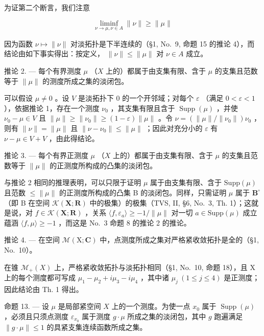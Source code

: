 为证第二个断言，我们注意

\[
\liminf _ {\nu \to \mu ,   \nu \in A} \| \nu \| \geqslant \| \mu \|
\]

因为函数 \(\nu \mapsto \| \nu \|\) 对淡拓扑是下半连续的（§1, No.~9, 命题 15 的推论 4），而结论由如下事实得出：按定义， \(\| \nu \| \leqslant \| \mu \|\) 对 \(\nu \in A\) 成立。

推论 2. --- 每个有界测度 \(\mu\) （\(X\) 上的）都属于由支集有限、含于 \(\mu\) 的支集且范数等于 \(\|\mu\|\) 的测度所成之集的淡闭包。

可以假设 \(\mu \neq 0\) 。设 \(V\) 是淡拓扑下 0 的一个开邻域；对每个 \(\varepsilon\) （满足 \(0 < \varepsilon < 1\) ），依据推论 1，存在一个测度 \(\nu_0\) ，其支集有限且含于 \(\operatorname{Supp}(\mu)\) ，并使 \(\nu_0 - \mu \in V\) 且 \(\| \mu \| \geqslant \| \nu_0 \| \geqslant (1 - \varepsilon) \| \mu \|\) 。令 \(\nu = (\| \mu \| / \| \nu_0 \|) \nu_0\) ，则有 \(\| \nu \| = \| \mu \|\) 且 \(\| \nu - \nu_0 \| \leqslant \| \mu \|\) ；因此对充分小的 \(\varepsilon\) 有 \(\nu - \mu \in V + V\) ，由此得结论。

推论 3. --- 每个有界正测度 \(\mu\) （\(X\) 上的）都属于由支集有限、含于 \(\mu\) 的支集且范数等于 \(\|\mu\|\) 的正测度所构成的凸集的淡闭包。

与推论 2 相同的推理表明，可以只限于证明 \(\mu\) 属于由支集有限、含于 \(\mathrm{Supp}(\mu)\) 且范数 \(\leqslant \| \mu \|\) 的正测度所构成的凸集 B 的淡闭包。同样，只需证明 \(\mu\) 属于 \(\mathbf{B}^{\circ}\) （即 B 在空间 \(\mathcal{K}(\mathbf{X};\mathbf{R})\) 中的极集）的极集（TVS, II, §6, No.~3, Th. 1）；这就是说，对 \(f\in \mathcal{K}(\mathbf{X};\mathbf{R})\) ，关系 \(\langle f,\varepsilon_a\rangle \geqslant -1 / \| \mu \|\) 对一切 \(a\in \mathrm{Supp}(\mu)\) 成立蕴涵 \(\langle f,\mu \rangle \geqslant -1\) ，而这是 No.~3 命题 8 的推论 2 的推论。

推论 4. --- 在空间 \(\mathcal{M}(\mathrm{X};\mathbf{C})\) 中，点测度所成之集对严格紧收敛拓扑是全的（§1, No.~10）。

在锥 \(\mathcal{M}_{+}(X)\) 上，严格紧收敛拓扑与淡拓扑相同（§1, No.~10, 命题 18），且 X 上的每个测度都可写成 \(\mu_{1}-\mu_{2}+i\mu_{3}-i\mu_{4}\) ，其中诸 \(\mu_{j}\ (1\leqslant j\leqslant4)\) 是正测度；因此结论由 Th. 1 得出。

命题 13. --- 设 \(\mu\) 是局部紧空间 \(X\) 上的一个测度。为使一点 \(x_0\) 属于 \(\operatorname{Supp}(\mu)\) ，必须且只须点测度 \(\varepsilon_{x_0}\) 属于测度 \(g \cdot \mu\) 所成之集的淡闭包，其中 \(g\) 跑遍满足 \(\| g \cdot \mu \| \leqslant 1\) 的具紧支集连续函数所成之集。

